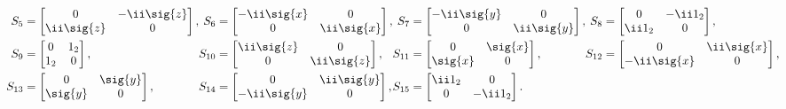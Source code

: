 \begin{unit}
\[\begin{aligned}
\mkern-18mu S_5&=\begin{bmatrix}0&-\ii\sig{z}\\\ii\sig{z}&0\end{bmatrix},&
\mkern-18mu S_6&=\begin{bmatrix}-\ii\sig{x}&0\\0&\ii\sig{x}\end{bmatrix},&
\mkern-18mu S_7&=\begin{bmatrix}-\ii\sig{y}&0\\0&\ii\sig{y}\end{bmatrix},&
\mkern-18mu S_8&=\begin{bmatrix}0&-\ii 1_2\\\ii 1_2&0\end{bmatrix},\\
\mkern-18mu S_9&=\begin{bmatrix}0&1_2\\1_2&0\end{bmatrix},&
\mkern-18mu S_{10}&=\begin{bmatrix}\ii\sig{z}&0\\0&\ii\sig{z}\end{bmatrix},&
\mkern-18mu S_{11}&=\begin{bmatrix}0&\sig{x}\\\sig{x}&0\end{bmatrix},&
\mkern-18mu S_{12}&=\begin{bmatrix}0&\ii \sig{x}\\-\ii \sig{x}&0\end{bmatrix},\\
\mkern-18mu
S_{13}&=\begin{bmatrix}0&\sig{y}\\\sig{y}&0\end{bmatrix},&
\mkern-18mu
S_{14}&=\begin{bmatrix}0&\ii\sig{y}\\-\ii\sig{y}&0\end{bmatrix},&
\mkern-18mu S_{15}&=\begin{bmatrix}\ii 1_2&0\\0&-\ii
1_2\end{bmatrix}.
\end{aligned}
\]
\end{unit}
%

